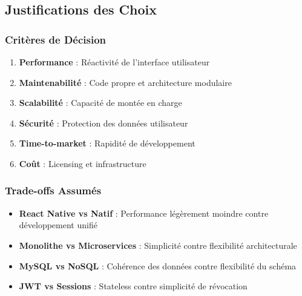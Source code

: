 \subsection{Justifications des Choix}

\subsubsection{Critères de Décision}

\begin{enumerate}
    \item \textbf{Performance} : Réactivité de l'interface utilisateur
    \item \textbf{Maintenabilité} : Code propre et architecture modulaire
    \item \textbf{Scalabilité} : Capacité de montée en charge
    \item \textbf{Sécurité} : Protection des données utilisateur
    \item \textbf{Time-to-market} : Rapidité de développement
    \item \textbf{Coût} : Licensing et infrastructure
\end{enumerate}

\subsubsection{Trade-offs Assumés}

\begin{itemize}
    \item \textbf{React Native vs Natif} : Performance légèrement moindre contre développement unifié
    \item \textbf{Monolithe vs Microservices} : Simplicité contre flexibilité architecturale
    \item \textbf{MySQL vs NoSQL} : Cohérence des données contre flexibilité du schéma
    \item \textbf{JWT vs Sessions} : Stateless contre simplicité de révocation
\end{itemize}